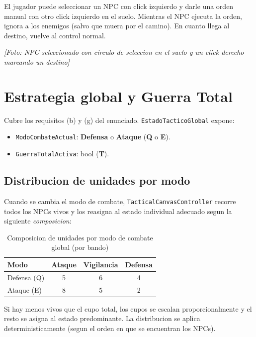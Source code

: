 \documentclass[12pt,a4paper]{article}
\newcommand{\fotoplaceholder}[1]{%
    \par\medskip\noindent%
    \begin{center}%
    \begin{tcolorbox}[
        colback=fotobg,
        colframe=fotoborder,
        boxrule=0.8pt,
        arc=2pt,
        width=0.85\textwidth,
        halign=center,
        valign=center,
        height=2.4cm
    ]
    \itshape\color{gray} [Foto: #1]
    \end{tcolorbox}%
    \end{center}\medskip%
}
\begin{document}
El jugador puede seleccionar un NPC con click izquierdo y darle una
orden manual con otro click izquierdo en el suelo. Mientras el NPC
ejecuta la orden, ignora a los enemigos (salvo que muera por el camino).
En cuanto llega al destino, vuelve al control normal.

\fotoplaceholder{NPC seleccionado con circulo de seleccion en el suelo y un click derecho marcando un destino}

\section{Estrategia global y Guerra Total}

Cubre los requisitos (b) y (g) del enunciado.
\texttt{EstadoTacticoGlobal} expone:

\begin{itemize}[leftmargin=1.5em]
    \item \texttt{ModoCombateActual}: \textbf{Defensa} o \textbf{Ataque} (\textbf{Q} o \textbf{E}).
    \item \texttt{GuerraTotalActiva}: bool (\textbf{T}).
\end{itemize}

\subsection{Distribucion de unidades por modo}

Cuando se cambia el modo de combate, \texttt{TacticalCanvasController}
recorre todos los NPCs vivos y los reasigna al estado individual
adecuado segun la siguiente \emph{composicion}:

\begin{table}[H]
\centering
\caption{Composicion de unidades por modo de combate global (por bando)}
\begin{tabular}{l|ccc}
\toprule
\textbf{Modo} & \textbf{Ataque} & \textbf{Vigilancia} & \textbf{Defensa} \\
\midrule
Defensa (Q)   & 5 & 6 & 4 \\
Ataque  (E)   & 8 & 5 & 2 \\
\bottomrule
\end{tabular}
\end{table}

Si hay menos vivos que el cupo total, los cupos se escalan
proporcionalmente y el resto se asigna al estado predominante. La
distribucion se aplica deterministicamente (segun el orden en que se
encuentran los NPCs).
\end{document}
